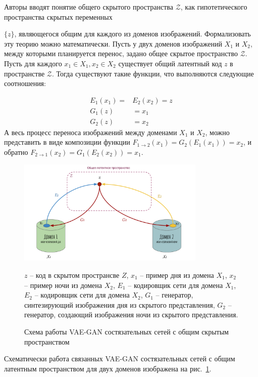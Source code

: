 \documentclass[11pt,a4paper]{extarticle}
\begin{document}
			Авторы вводят понятие общего скрытого пространства \(\mathcal{Z}\), как гипотетического пространства скрытых переменных {\(\{z\}\), являющегося общим для каждого из доменов изображений.
			Формализовать эту теорию можно математически. Пусть у двух доменов изображений \(X_1\) и \(X_2\), между которыми планируется перенос, задано общее скрытое пространство \(\mathcal{Z}\).
			Пусть для каждого \(x_1 \in X_1, x_2 \in X_2\) существует общий латентный код \(z\) в пространстве \(\mathcal{Z}\).
			Тогда существуют такие функции, что выполняются следующие соотношения:
			
			\begin{equation}
				\begin{aligned}
					E_1(x_1) = &E_2(x_2) = z\\
					G_1(z) &= x_1\\
					G_2(z) &= x_2
				\end{aligned}
			\end{equation}
			А весь процесс переноса изображений между доменами \(X_1\) и \(X_2\), можно представить в виде композиции функции \(F_{1 \rightarrow 2}(x_1) = G_2(E_1(x_1)) = x_2\),
			и обратно \(F_{2 \rightarrow 1}(x_2) = G_1(E_2(x_2)) = x_1\). 

			\begin{figure}[ht]
				\centering
				\includegraphics[width=0.8\textwidth]{img/unit}
				\caption{Схема работы VAE-GAN состязательных сетей с общим скрытым пространством}{
					\small{
						\(z\) -- код в скрытом пространсве \(Z\), \(x_1\) -- пример дня из домена \(X_1\),
						\(x_2\) -- пример ночи из домена \(X_2\), \(E_1\) -- кодировщик сети для домена \(X_1\),
						\(E_2\) -- кодировщик сети для домена \(X_2\), \(G_1\) -- генератор, синтезирующий изображения дня из скрытого представления,
						\(G_2\) -- генератор, создающий изображения ночи из скрытого представления.
					}
				}
				\label{pic:unit}
			\end{figure}
			\noindent
			Схематически работа связанных VAE-GAN состязательных сетей с общим латентным пространством для двух доменов изображена на рис.~\ref{pic:unit}.
			
}
\end{document}
